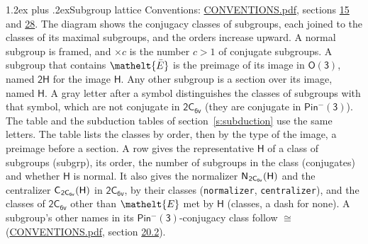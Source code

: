 \documentclass[10pt,a4paper]{article}
\makeatletter
\renewcommand\section{\@startsection{section}{1}{\z@}{-3ex plus -1ex minus -.2ex}%
  {1.2ex plus .2ex}{\normalfont\large\sffamily\bfseries\color{parttitle}}}
\numberwithin{equation}{section}
\newcommand{\eltfont}[1]{{\let\sigma\eltsigma\mathelt{#1}}}
\newcommand{\grp}[1]{\mathsf{#1}}
\newcommand{\cls}[1]{\eltfont{#1}}
\newcommand{\elt}[1]{\eltfont{#1}}
\newcommand{\samecls}{\cong}
\newcommand{\barred}[1]{\bar{#1}}
\newcommand{\hairsp}{\mkern1mu}
\makeatother
\begin{document}
\section{Subgroup lattice}\label{s:subgroups}
Conventions: \href{../../CONVENTIONS.pdf}{CONVENTIONS.pdf}, sections \href{../../../rotation/CONVENTIONS.pdf\#conv.15}{15} and \href{../../CONVENTIONS.pdf\#conv.28}{28}.
The diagram shows the conjugacy classes of subgroups, each joined to the classes of its maximal subgroups, and the orders increase upward. A normal subgroup is framed, and ${\times}c$ is the number $c > 1$ of conjugate subgroups. \label{n:group.H}A subgroup that contains $\elt{\barred{E}}$ is the preimage of its image in $\grp{O(3)}$, named $\grp{2H}$ for the image $\grp{H}$. Any other subgroup is a section over its image, named $\grp{H}$. \label{n:mark.letter}A gray letter after a symbol distinguishes the classes of subgroups with that symbol, which are not conjugate in $\grp{2C_{6v}}$ (they are conjugate in \href{Pinminus3.pdf}{$\grp{Pin^{-}(3)}$}). The table and the subduction tables of section~\ref{s:subduction} use the same letters. The table lists the classes by order, then by the type of the image, a preimage before a section. \label{n:head.subgroup}\label{n:head.order}\label{n:head.conjugates}\label{n:head.normal}A row gives the representative $\grp{H}$ of a class of subgroups (subgrp), its order, the number of subgroups in the class (conjugates) and whether $\grp{H}$ is normal. \label{n:group.normalizer}\label{n:group.centralizer}\label{n:head.classes}It also gives the normalizer $\grp{N}_{\hairsp \grp{2C_{6v}}}(\grp{H})$ and the centralizer $\grp{C}_{\hairsp \grp{2C_{6v}}}(\grp{H})$ in $\grp{2C_{6v}}$, by their classes (\texttt{normalizer}, \texttt{centralizer}), and the classes of $\grp{2C_{6v}}$ other than $\cls{E}$ met by $\grp{H}$ (classes, a dash for none). A subgroup's other names in its \href{Pinminus3.pdf}{$\grp{Pin^{-}(3)}$}-conjugacy class follow $\samecls$ (\href{../../CONVENTIONS.pdf}{CONVENTIONS.pdf}, section \href{../../CONVENTIONS.pdf\#conv.20.2}{20.2}).
\end{document}

